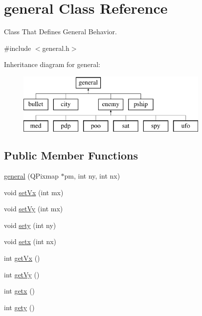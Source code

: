 \hypertarget{classgeneral}{\section{general \-Class \-Reference}
\label{classgeneral}
}


\-Class \-That \-Defines \-General \-Behavior.  




{\ttfamily \#include $<$general.\-h$>$}

\-Inheritance diagram for general\-:\begin{figure}[H]
\begin{center}
\leavevmode
\includegraphics[height=3.000000cm]{classgeneral}
\end{center}
\end{figure}
\subsection*{\-Public \-Member \-Functions}
\begin{DoxyCompactItemize}
\item 
\hyperlink{classgeneral_a70ceaee532e7e8815bd0c93a3644a24f}{general} (\-Q\-Pixmap $\ast$pm, int ny, int nx)
\item 
void \hyperlink{classgeneral_a985814c4fbbe0f63881ca77a6b9fe7ae}{set\-Vx} (int mx)
\item 
void \hyperlink{classgeneral_ae7b2af937f63162adf022baba4d036bd}{set\-Vy} (int mx)
\item 
void \hyperlink{classgeneral_a2014439b24c33c186f049e2bf9a27dce}{sety} (int ny)
\item 
void \hyperlink{classgeneral_a762f28b6b43d7cc0d35ba3e899a51d53}{setx} (int nx)
\item 
int \hyperlink{classgeneral_a09533f862df0cfc41f7a0bb841f0bfe7}{get\-Vx} ()
\item 
int \hyperlink{classgeneral_a224beb0725ad5406203357bb128e76b2}{get\-Vy} ()
\item 
int \hyperlink{classgeneral_a28c36909fac13d5cd2c6876009d12c3f}{getx} ()
\item 
int \hyperlink{classgeneral_abc8d35c507d0a712e206f55b01f9907e}{gety} ()
\end{DoxyCompactItemize}


